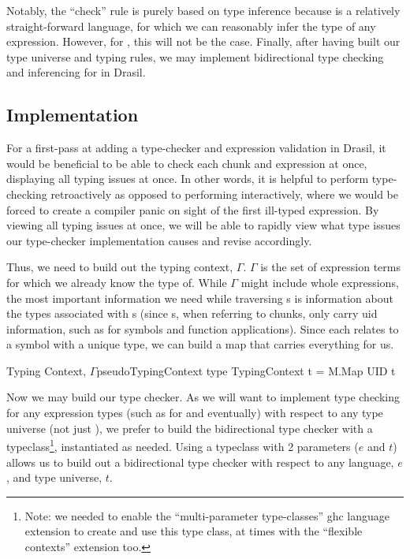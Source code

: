 Notably, the ``check'' rule is purely based on type inference because \Expr{} is
a relatively straight-forward language, for which we can reasonably infer the
type of any expression. However, for \ModelExpr{}, this will not be the case.
Finally, after having built our type universe and typing rules, we may implement
bidirectional type checking and inferencing for \Expr{} in Drasil.

\subsection{Implementation}
\label{chap:typed-expr:sec:typing-the-expression-language:subsec:implementation}

For a first-pass at adding a type-checker and expression validation in Drasil,
it would be beneficial to be able to check each chunk and expression at once,
displaying all typing issues at once. In other words, it is helpful to perform
type-checking retroactively as opposed to performing interactively, where we
would be forced to create a compiler panic on sight of the first ill-typed
expression. By viewing all typing issues at once, we will be able to rapidly
view what type issues our type-checker implementation causes and revise
accordingly.

Thus, we need to build out the typing context, \(\Gamma\). \(\Gamma\) is the set
of expression terms for which we already know the type of. While \(\Gamma\)
might include whole expressions, the most important information we need while
traversing \Expr{}s is information about the types associated with \UID{}s
(since \Expr{}s, when referring to chunks, only carry \acs{uid} information,
such as for symbols and function applications). Since each \UID{} relates to a
symbol with a unique type, we can build a map that carries everything for us.

\begin{pseudohaskell}{Typing Context, \(\Gamma\)}{pseudoTypingContext}
type TypingContext t = M.Map UID t
\end{pseudohaskell}

Now we may build our type checker. As we will want to implement type checking
for any expression types (such as for \CodeExpr{} and \ModelExpr{} eventually)
with respect to any type universe (not just \Space{}), we prefer to build the
bidirectional type checker with a typeclass\footnote{Note: we needed to enable
the ``multi-parameter type-classes'' \cite{GHC2020MultiParamTypeClasses}
\acs{ghc} language extension to create and use this type class, at times with
the ``flexible contexts'' \cite{GHC2020FlexibleContexts} extension too.},
instantiated as needed. Using a typeclass with 2 parameters (\(e\) and \(t\))
allows us to build out a bidirectional type checker with respect to any
language, \(e\), and type universe, \(t\).


